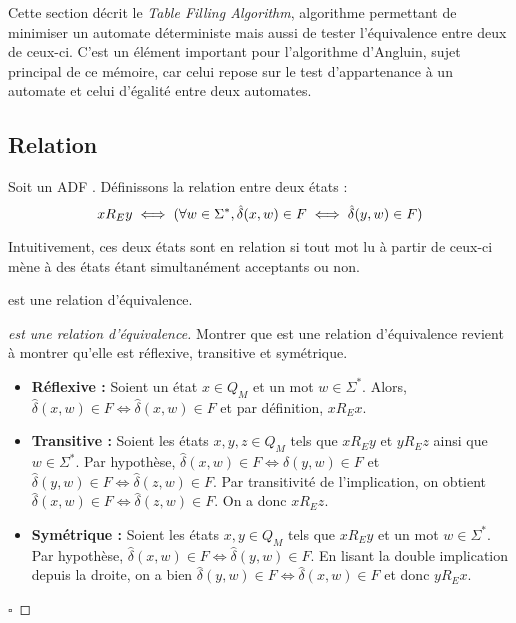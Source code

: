 Cette section décrit le \emph{Table Filling Algorithm}, algorithme permettant de minimiser un automate déterministe mais aussi de tester l'équivalence entre deux de ceux-ci. C'est un élément important pour l'algorithme d'Angluin, sujet principal de ce mémoire, car celui repose sur le test d'appartenance à un automate et celui d'égalité entre deux automates.






\subsection{Relation \re}\label{ss:re}

Soit un ADF \automaton. Définissons la relation \re entre deux états :
$$xR_Ey \iff (\forall w \in \Sigma^*,\hat{\delta}(x,w) \in F \iff \hat{\delta}(y,w) \in F)$$

Intuitivement, ces deux états sont en relation si tout mot lu à partir de ceux-ci mène à des états étant simultanément acceptants ou non.

\begin{proposition}[\re]
 \re est une relation d'équivalence.
\end{proposition}

\begin{proof}[\re est une relation d'équivalence] Montrer que \re est une relation d'équivalence revient à montrer qu'elle est réflexive, transitive et symétrique.
 \begin{itemize}
	 \item \textbf{Réflexive :} Soient un état $x \in Q_M$ et un mot $w \in \Sigma^*$. Alors, $\hat{\delta}(x,w) \in F \iff \hat{\delta}(x,w) \in F$ et par définition, $xR_Ex$.
	 \item \textbf{Transitive :} Soient les états $x,y,z \in Q_M$ tels que $xR_Ey$ et $yR_Ez$ ainsi que $w \in \Sigma^*$. Par hypothèse, $\hat{\delta}(x,w) \in F \iff \hat{\delta}(y,w)\in F$ et $\hat{\delta}(y,w) \in F\iff \hat{\delta}(z,w) \in F$. Par transitivité de l'implication, on obtient $\hat{\delta}(x,w) \in F \iff \hat{\delta}(z,w)\in F$. On a donc $xR_Ez$.
	 \item \textbf{Symétrique : } Soient les états $x,y \in Q_M$ tels que $xR_Ey$ et un mot $w \in \Sigma^*$. Par hypothèse, $\hat{\delta}(x, w)\in F \iff \hat{\delta}(y, w)\in F$. En lisant la double implication depuis la droite, on a bien $\hat{\delta}(y, w) \in F\iff \hat{\delta}(x, w)\in F$ et donc $yR_Ex$.
 \end{itemize}
 \hfill$\square$
\end{proof}


